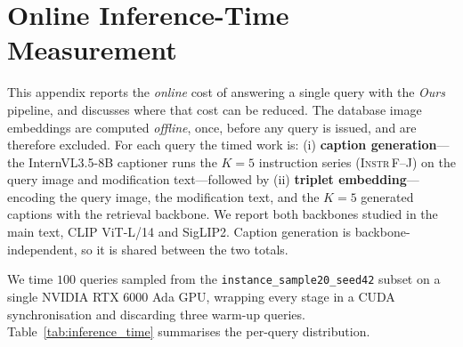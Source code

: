 

\chapter{Online Inference-Time Measurement}\label{app:inference_time}

This appendix reports the \emph{online} cost of answering a single query with
the \emph{Ours} pipeline, and discusses where that cost can be reduced. The
database image embeddings are computed \emph{offline}, once, before any query is
issued, and are therefore excluded. For each query the timed work is: (i)
\textbf{caption generation}---the InternVL3.5-8B captioner runs the $K{=}5$
instruction series (\textsc{Instr\,F}--\textsc{J}) on the query image and
modification text---followed by (ii) \textbf{triplet embedding}---encoding the
query image, the modification text, and the $K{=}5$ generated captions with the
retrieval backbone. We report both backbones studied in the main text, CLIP
ViT-L/14 and SigLIP2. Caption generation is backbone-independent, so it is
shared between the two totals.

We time $100$ queries sampled from the \texttt{instance\_sample20\_seed42}
subset on a single NVIDIA RTX 6000 Ada GPU, wrapping every stage in a CUDA
synchronisation and discarding three warm-up queries. Table~\ref{tab:inference_time}
summarises the per-query distribution.

